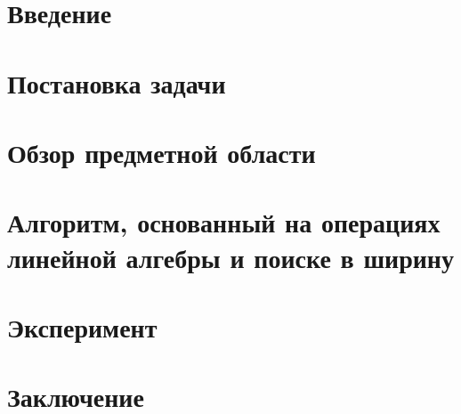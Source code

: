 




\usepackage{totcount}
\usepackage{algorithm}%
\usepackage[noend]{algpseudocode}%
\usepackage{multirow}
\usepackage{nicematrix}
\usepackage{tikz}
\usetikzlibrary{fit}
\usetikzlibrary{arrows,automata}

\theoremstyle{definition}
\newtheorem{rudefinition}{Определение}[section]
\newtheorem{example}{Example}[section]
\newtheorem{theorem}{Theorem}[section]
\newtheorem{proposition}[theorem]{Proposition}
\newtheorem{lemma}[theorem]{Lemma}
\newtheorem{corollary}[theorem]{Corollary}
\newtheorem{conjecture}[theorem]{Conjecture}
\newtheorem{note}[theorem]{Утверждение}





\maketitle
\setcounter{tocdepth}{2}
\tableofcontents

\section*{Введение}


\section{Постановка задачи}


\section{Обзор предметной области}


\section{Алгоритм, основанный на операциях линейной алгебры и поиске в ширину}


\section{Эксперимент}


\pagebreak

\section*{Заключение}


\setmonofont[Mapping=tex-text]{CMU Typewriter Text}




